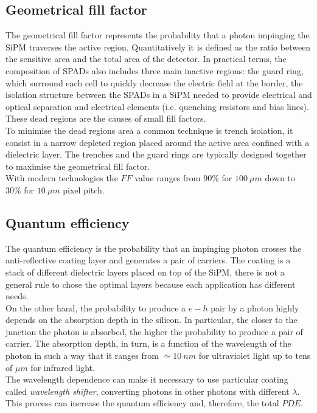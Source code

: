 \subsection*{Geometrical fill factor}
The geometrical fill factor represents the probability that a photon impinging the SiPM traverses the active region. Quantitatively it is defined as the ratio between the sensitive area and the total area of the detector. In practical terms, the composition of SPADs also includes three main inactive regions: the guard ring, which surround each cell to quickly decrease the electric field at the border, the isolation structure between the SPADs in a SiPM needed to provide electrical and optical separation and electrical elements (i.e. quenching resistors and bias lines). 
These dead regions are the causes of small fill factors.\\
To minimise the dead regions area a common technique is trench isolation, it consist in a narrow depleted region placed around the active area confined with a dielectric layer. The trenches and the guard rings are typically designed together to maximise the geometrical fill factor.\\
With modern technologies the $FF$ value ranges from $90\%$ for $100\ \mu m$ down to $30\%$ for $10\ \mu m$ pixel pitch.

\subsection*{Quantum efficiency}
The quantum efficiency is the probability that an impinging photon crosses the anti-reflective coating layer and generates a pair of carriers.
The coating is a stack of different dielectric layers placed on top of the SiPM, there is not a general rule to chose the optimal layers because each application has different needs. \\
On the other hand, the probability to produce a $e-h$ pair by a photon highly depends on the absorption depth in the silicon. In particular, the closer to the junction the photon is absorbed, the higher the probability to produce a pair of carrier.
The absorption depth, in turn, is a function of the wavelength of the photon in such a way that it ranges from $\simeq 10\ nm$ for ultraviolet light up to tens of $\mu m$ for infrared light.\\
The wavelength dependence can make it necessary to use particular coating called \textit{wavelength shifter}, converting photons in other photons with different $\lambda$. This process can increase the quantum efficiency and, therefore, the total $PDE$.

